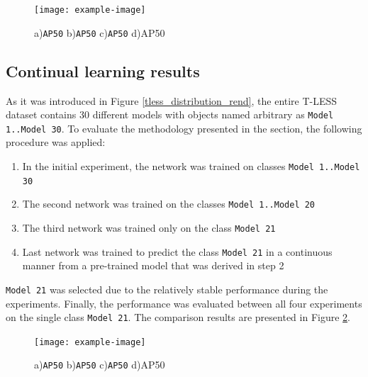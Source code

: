 \documentclass[english, 12pt, a4paper, elec, utf8, a-1b, online]{aaltothesis}
\begin{document}
\begin{figure}[htb]
	\begin{center}
		\texttt{[image: example-image]}
	\end{center}
	\caption{a)\texttt{AP50} b)\texttt{AP50} c)\texttt{AP50} d)AP50}
	\begin{center}
		\label{myModel_withOrigSched}
	\end{center}
\end{figure}
\FloatBarrier  



\subsection{Continual learning results}
\label{cont_learning_results} 
As it was introduced in Figure \ref{tless_distribution_rend}, the entire T-LESS dataset contains 30 different models with objects named arbitrary as \texttt{Model 1..Model 30}. To evaluate the methodology presented in the  section, the following procedure was applied:
 
\begin{enumerate}
\item In the initial experiment, the network was trained on classes \texttt{Model 1..Model 30}
\item The second network was trained on the classes \texttt{Model 1..Model 20}
\item The third network was trained only on the class \texttt{Model 21}
\item Last network was trained to predict the class \texttt{Model 21} in a continuous manner from a pre-trained model that was derived in step 2
\end{enumerate} 

\texttt{Model 21} was selected due to the relatively stable performance during the experiments. Finally, the performance was evaluated between all four experiments on the single class \texttt{Model 21}. The comparison results are presented in Figure \ref{myModel_continuous_experiment_1}.

\begin{figure}[htb]
	\begin{center}
		\texttt{[image: example-image]}
	\end{center}
	\caption{a)\texttt{AP50} b)\texttt{AP50} c)\texttt{AP50} d)AP50}
	\begin{center}
		\label{myModel_continuous_experiment_1}
	\end{center}
\end{figure}
\FloatBarrier  
\end{document}
